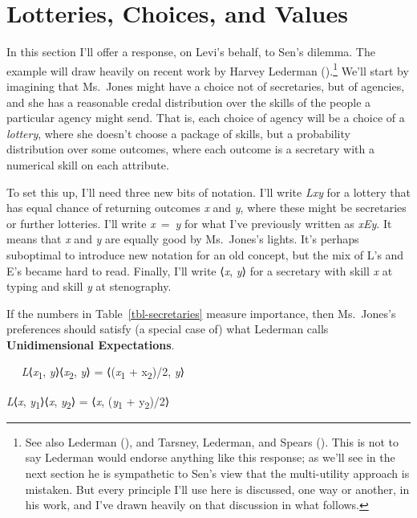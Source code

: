 \documentclass[
  11pt,
  letterpaper,
  DIV=11,
  numbers=noendperiod,
  twoside]{scrartcl}
\providecommand{\tightlist}{%
  \setlength{\itemsep}{0pt}\setlength{\parskip}{0pt}}
\begin{document}
\section{Lotteries, Choices, and Values}\label{sec-lotteries}

In this section I'll offer a response, on Levi's behalf, to Sen's
dilemma. The example will draw heavily on recent work by Harvey Lederman
().\footnote{See also Lederman
  (), and Tarsney, Lederman, and Spears
  (). This is not to say
  Lederman would endorse anything like this response; as we'll see in
  the next section he is sympathetic to Sen's view that the
  multi-utility approach is mistaken. But every principle I'll use here
  is discussed, one way or another, in his work, and I've drawn heavily
  on that discussion in what follows.} We'll start by imagining that
Ms.~Jones might have a choice not of secretaries, but of agencies, and
she has a reasonable credal distribution over the skills of the people a
particular agency might send. That is, each choice of agency will be a
choice of a \emph{lottery}, where she doesn't choose a package of
skills, but a probability distribution over some outcomes, where each
outcome is a secretary with a numerical skill on each attribute.

To set this up, I'll need three new bits of notation. I'll write
\emph{Lxy} for a lottery that has equal chance of returning outcomes
\emph{x} and \emph{y}, where these might be secretaries or further
lotteries. I'll write \emph{x}~=~\emph{y} for what I've previously
written as \emph{xEy}. It means that \emph{x} and \emph{y} are equally
good by Ms.~Jones's lights. It's perhaps suboptimal to introduce new
notation for an old concept, but the mix of L's and E's became hard to
read. Finally, I'll write ⟨\emph{x}, \emph{y}⟩ for a secretary with
skill \emph{x} at typing and skill \emph{y} at stenography.

If the numbers in Table~\ref{tbl-secretaries} measure importance, then
Ms.~Jones's preferences should satisfy (a special case of) what Lederman
calls \textbf{Unidimensional Expectations}.

\begin{description}
\tightlist
\item[Unidimensional Expectations (UE)]
~\newline~ \emph{L}⟨\emph{x}\textsubscript{1},
\emph{y}⟩⟨\emph{x}\textsubscript{2}, \emph{y}⟩ =
⟨(\emph{x}\textsubscript{1} + x\textsubscript{2})/2, \emph{y}⟩

\emph{L}⟨\emph{x}, \emph{y}\textsubscript{1}⟩⟨\emph{x},
\emph{y}\textsubscript{2}⟩ = ⟨\emph{x}, (\emph{y}\textsubscript{1} +
y\textsubscript{2})/2⟩
\end{description}
\end{document}
